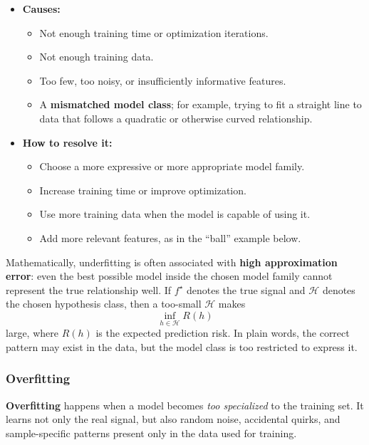 \documentclass[12pt,openany]{book}
\begin{document}
\begin{itemize}[leftmargin=*]
    \item \textbf{Causes:}
    \begin{itemize}[leftmargin=*]
        \item Not enough training time or optimization iterations.
        \item Not enough training data.
        \item Too few, too noisy, or insufficiently informative features.
        \item A \textbf{mismatched model class}; for example, trying to fit a straight line to data that follows a quadratic or otherwise curved relationship.
    \end{itemize}
    \item \textbf{How to resolve it:}
    \begin{itemize}[leftmargin=*]
        \item Choose a more expressive or more appropriate model family.
        \item Increase training time or improve optimization.
        \item Use more training data when the model is capable of using it.
        \item Add more relevant features, as in the ``ball'' example below.
    \end{itemize}
\end{itemize}

Mathematically, underfitting is often associated with \textbf{high approximation error}: even the best possible model inside the chosen model family cannot represent the true relationship well. If \(f^{\star}\) denotes the true signal and \(\mathcal{H}\) denotes the chosen hypothesis class, then a too-small \(\mathcal{H}\) makes
\begin{equation*}
    \inf_{h \in \mathcal{H}} R(h)
\end{equation*}
large, where \(R(h)\) is the expected prediction risk. In plain words, the correct pattern may exist in the data, but the model class is too restricted to express it.

\subsubsection{Overfitting}

\textbf{Overfitting} happens when a model becomes \textit{too specialized} to the training set. It learns not only the real signal, but also random noise, accidental quirks, and sample-specific patterns present only in the data used for training.
\end{document}
